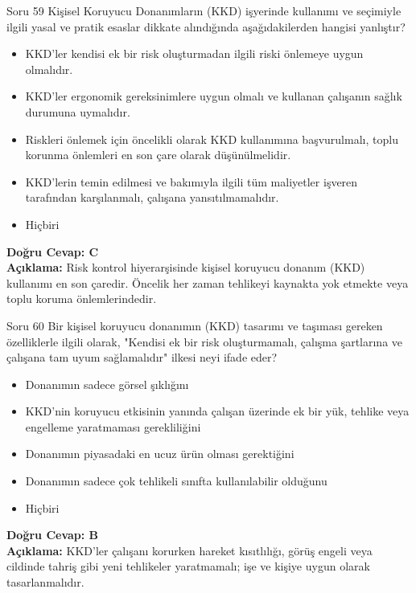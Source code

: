 \documentclass[12pt,a4paper]{article}
\begin{document}
\begin{testcard}{Soru 59}
    Kişisel Koruyucu Donanımların (KKD) işyerinde kullanımı ve seçimiyle ilgili yasal ve pratik esaslar dikkate alındığında aşağıdakilerden hangisi yanlıştır?
    \begin{itemize}
        \item[A)] KKD'ler kendisi ek bir risk oluşturmadan ilgili riski önlemeye uygun olmalıdır.
        \item[B)] KKD'ler ergonomik gereksinimlere uygun olmalı ve kullanan çalışanın sağlık durumuna uymalıdır.
        \item[C)] Riskleri önlemek için öncelikli olarak KKD kullanımına başvurulmalı, toplu korunma önlemleri en son çare olarak düşünülmelidir.
        \item[D)] KKD'lerin temin edilmesi ve bakımıyla ilgili tüm maliyetler işveren tarafından karşılanmalı, çalışana yansıtılmamalıdır.
        \item[E)] Hiçbiri
    \end{itemize}
    \tcblower
    \textbf{Doğru Cevap: C} \\
    \textbf{Açıklama:} Risk kontrol hiyerarşisinde kişisel koruyucu donanım (KKD) kullanımı en son çaredir. Öncelik her zaman tehlikeyi kaynakta yok etmekte veya toplu koruma önlemlerindedir.
\end{testcard}

\begin{testcard}{Soru 60}
    Bir kişisel koruyucu donanımın (KKD) tasarımı ve taşıması gereken özelliklerle ilgili olarak, "Kendisi ek bir risk oluşturmamalı, çalışma şartlarına ve çalışana tam uyum sağlamalıdır" ilkesi neyi ifade eder?
    \begin{itemize}
        \item[A)] Donanımın sadece görsel şıklığını
        \item[B)] KKD'nin koruyucu etkisinin yanında çalışan üzerinde ek bir yük, tehlike veya engelleme yaratmaması gerekliliğini
        \item[C)] Donanımın piyasadaki en ucuz ürün olması gerektiğini
        \item[D)] Donanımın sadece çok tehlikeli sınıfta kullanılabilir olduğunu
        \item[E)] Hiçbiri
    \end{itemize}
    \tcblower
    \textbf{Doğru Cevap: B} \\
    \textbf{Açıklama:} KKD'ler çalışanı korurken hareket kısıtlılığı, görüş engeli veya cildinde tahriş gibi yeni tehlikeler yaratmamalı; işe ve kişiye uygun olarak tasarlanmalıdır.
\end{testcard}
\end{document}

